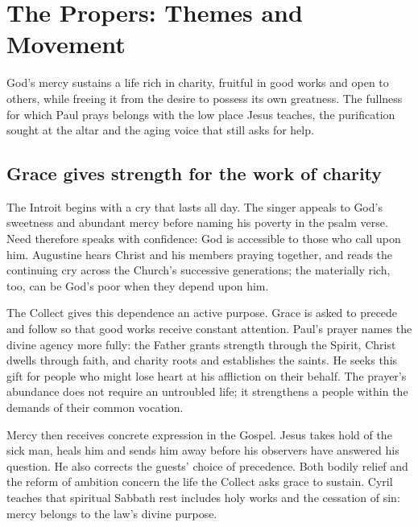 \section*{The Propers: Themes and Movement}
\label{triptych:brief-synthesis:start}
God's mercy sustains a life rich in charity, fruitful in good works and open to others, while freeing it from the desire to possess its own greatness. The fullness for which Paul prays belongs with the low place Jesus teaches, the purification sought at the altar and the aging voice that still asks for help.

\subsection*{Grace gives strength for the work of charity}
The Introit begins with a cry that lasts all day. The singer appeals to God's sweetness and abundant mercy before naming his poverty in the psalm verse. Need therefore speaks with confidence: God is accessible to those who call upon him. Augustine hears Christ and his members praying together, and reads the continuing cry across the Church's successive generations; the materially rich, too, can be God's poor when they depend upon him. 

The Collect gives this dependence an active purpose. Grace is asked to precede and follow so that good works receive constant attention. Paul's prayer names the divine agency more fully: the Father grants strength through the Spirit, Christ dwells through faith, and charity roots and establishes the saints. He seeks this gift for people who might lose heart at his affliction on their behalf. The prayer's abundance does not require an untroubled life; it strengthens a people within the demands of their common vocation. 

Mercy then receives concrete expression in the Gospel. Jesus takes hold of the sick man, heals him and sends him away before his observers have answered his question. He also corrects the guests' choice of precedence. Both bodily relief and the reform of ambition concern the life the Collect asks grace to sustain. Cyril teaches that spiritual Sabbath rest includes holy works and the cessation of sin: mercy belongs to the law's divine purpose. 

